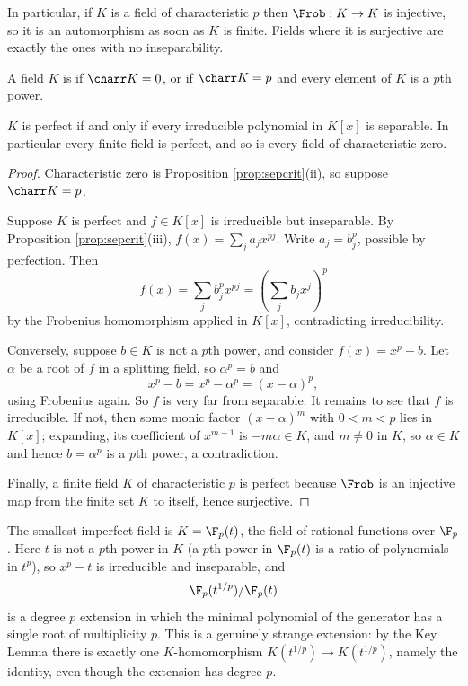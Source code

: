 In particular, if $K$ is a field of characteristic $p$ then $\Frob : K \to K$ is injective, so it is an automorphism as soon as $K$ is finite. Fields where it is surjective are exactly the ones with no inseparability.

\begin{definition}
	A field $K$ is  if $\charr K = 0$, or if $\charr K = p$ and every element of $K$ is a $p$th power.
\end{definition}

\begin{proposition}\label{prop:perfect}
	$K$ is perfect if and only if every irreducible polynomial in $K[x]$ is separable. In particular every finite field is perfect, and so is every field of characteristic zero.
\end{proposition}

\begin{proof}
	Characteristic zero is Proposition \ref{prop:sepcrit}(ii), so suppose $\charr K = p$.

	Suppose $K$ is perfect and $f \in K[x]$ is irreducible but inseparable. By Proposition \ref{prop:sepcrit}(iii), $f(x) = \sum_j a_j x^{pj}$. Write $a_j = b_j^p$, possible by perfection. Then
	$$f(x) = \sum_j b_j^p x^{pj} = \left(\sum_j b_j x^j\right)^p$$
	by the Frobenius homomorphism applied in $K[x]$, contradicting irreducibility.

	Conversely, suppose $b \in K$ is not a $p$th power, and consider $f(x) = x^p - b$. Let $\alpha$ be a root of $f$ in a splitting field, so $\alpha^p = b$ and
	$$x^p - b = x^p - \alpha^p = (x-\alpha)^p,$$
	using Frobenius again. So $f$ is very far from separable. It remains to see that $f$ is irreducible. If not, then some monic factor $(x-\alpha)^m$ with $0 < m < p$ lies in $K[x]$; expanding, its coefficient of $x^{m-1}$ is $-m\alpha \in K$, and $m \neq 0$ in $K$, so $\alpha \in K$ and hence $b = \alpha^p$ is a $p$th power, a contradiction.

	Finally, a finite field $K$ of characteristic $p$ is perfect because $\Frob$ is an injective map from the finite set $K$ to itself, hence surjective.
\end{proof}

\begin{example}
	The smallest imperfect field is $K = \F_p(t)$, the field of rational functions over $\F_p$. Here $t$ is not a $p$th power in $K$ (a $p$th power in $\F_p(t)$ is a ratio of polynomials in $t^p$), so $x^p - t$ is irreducible and inseparable, and
	$$\F_p(t^{1/p}) / \F_p(t)$$
	is a degree $p$ extension in which the minimal polynomial of the generator has a single root of multiplicity $p$. This is a genuinely strange extension: by the Key Lemma there is exactly one $K$-homomorphism $K(t^{1/p}) \to K(t^{1/p})$, namely the identity, even though the extension has degree $p$.
\end{example}

